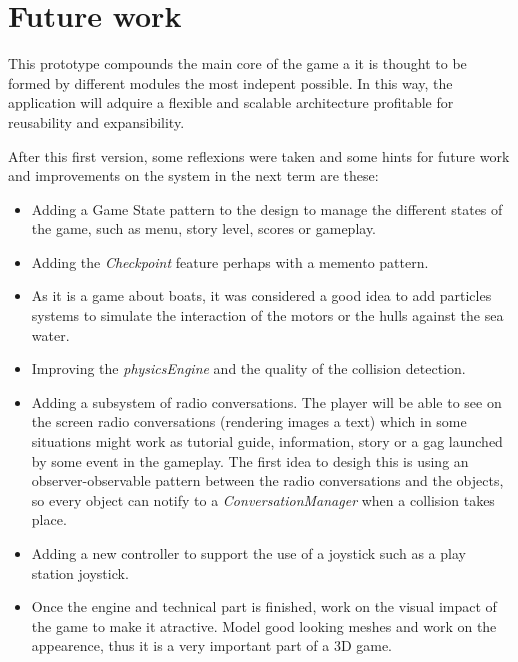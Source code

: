 \documentclass[]{article}
\begin{document}

\section{Future work}

This prototype compounds the main core of the game a it is thought to be formed by different modules the most indepent possible. In this way, the application will adquire a flexible and scalable architecture profitable for reusability and expansibility.

After this first version, some reflexions were taken and some hints for future work and improvements on the system in the next term are these:

\begin{itemize}
\item Adding a Game State pattern to the design to manage the different states of the game, such as menu, story level, scores or gameplay.
\item Adding the \emph{Checkpoint} feature perhaps with a memento pattern.
\item As it is a game about boats, it was considered a good idea to add particles systems to simulate the interaction of the motors or the hulls against the sea water.
\item Improving the \emph{physicsEngine} and the quality of the collision detection.
\item Adding a subsystem of radio conversations. The player will be able to see on the screen radio conversations (rendering images a text) which in some situations might work as tutorial guide, information, story or a gag launched by some event in the gameplay. The first idea to desigh this is using an observer-observable pattern between the radio conversations and the objects, so every object can notify to a \emph{ConversationManager} when a collision takes place.
\item Adding a new controller to support the use of a joystick such as a play station joystick.
\item Once the engine and technical part is finished, work on the visual impact of the game to make it atractive. Model good looking meshes and work on the appearence, thus it is a very important part of a 3D game.
\end{itemize}
\end{document}
